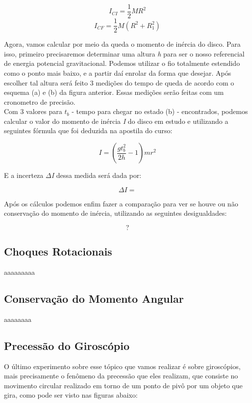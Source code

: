 \[I_{CI} = \frac{1}{2}MR^2\]
\[I_{CF} = \frac{1}{2}M(R^2 + R_1^2)\]

Agora, vamos calcular por meio da queda o momento de inércia do disco. Para isso, primeiro precisaremos determinar uma altura \textit{h} para ser o nosso referencial de energia potencial gravitacional. Podemos utilizar o fio totalmente estendido como o ponto mais baixo, e a partir daí enrolar da forma que desejar. Após escolher tal altura será feito 3 medições do tempo de queda de acordo com o esquema (a) e (b) da figura anterior. Essas medições serão feitas com um cronometro de precisão.\\

Com 3 valores para \textit{$t_b$} - tempo para chegar no estado (b) - encontrados, podemos calcular o valor do momento de inércia \textit{I} do disco em estudo e utilizando a seguintes fórmula que foi deduzida na apostila do curso:

\[I = \left( \frac{gt_b^2}{2h} - 1 \right) mr^2\]

E a incerteza \textit{$\Delta$I} dessa medida será dada por:

\[\Delta I = \]

Após os cálculos podemos enfim fazer a comparação para ver se houve ou não conservação do momento de inércia, utilizando as seguintes desigualdades:

\[?\]


\subsection{Choques Rotacionais}

aaaaaaaaa


\subsection{Conservação do Momento Angular}

aaaaaaaa


\subsection{Precessão do Giroscópio}

O último experimento sobre esse tópico que vamos realizar é sobre giroscópios, mais precisamente o fenômeno da precessão que eles realizam, que consiste no movimento circular realizado em torno de um ponto de pivô por um objeto que gira, como pode ser visto nas figuras abaixo:

